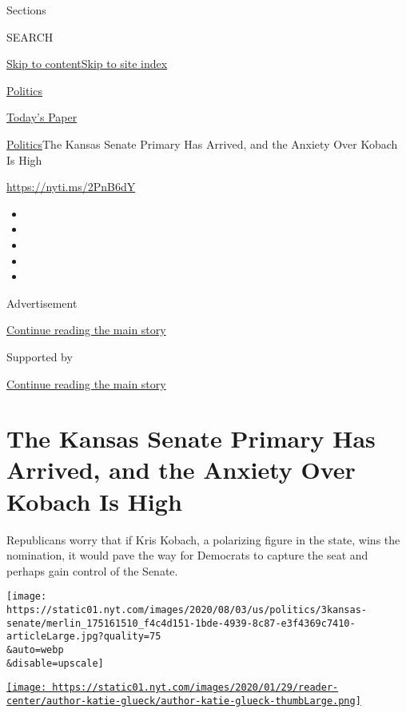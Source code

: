 Sections

SEARCH

\protect\hyperlink{site-content}{Skip to
content}\protect\hyperlink{site-index}{Skip to site index}

\href{https://www.nytimes.com/section/politics}{Politics}

\href{https://myaccount.nytimes.com/auth/login?response_type=cookie\&client_id=vi}{}

\href{https://www.nytimes.com/section/todayspaper}{Today's Paper}

\href{/section/politics}{Politics}\textbar{}The Kansas Senate Primary
Has Arrived, and the Anxiety Over Kobach Is High

\url{https://nyti.ms/2PnB6dY}

\begin{itemize}
\item
\item
\item
\item
\item
\end{itemize}

Advertisement

\protect\hyperlink{after-top}{Continue reading the main story}

Supported by

\protect\hyperlink{after-sponsor}{Continue reading the main story}

\hypertarget{the-kansas-senate-primary-has-arrived-and-the-anxiety-over-kobach-is-high}{%
\section{The Kansas Senate Primary Has Arrived, and the Anxiety Over
Kobach Is
High}\label{the-kansas-senate-primary-has-arrived-and-the-anxiety-over-kobach-is-high}}

Republicans worry that if Kris Kobach, a polarizing figure in the state,
wins the nomination, it would pave the way for Democrats to capture the
seat and perhaps gain control of the Senate.

\texttt{[image: https://static01.nyt.com/images/2020/08/03/us/politics/3kansas-senate/merlin\_175161510\_f4c4d151-1bde-4939-8c87-e3f4369c7410-articleLarge.jpg?quality=75\\\&auto=webp\\\&disable=upscale]}

\href{https://www.nytimes.com/by/katie-glueck}{\texttt{[image: https://static01.nyt.com/images/2020/01/29/reader-center/author-katie-glueck/author-katie-glueck-thumbLarge.png]}}

